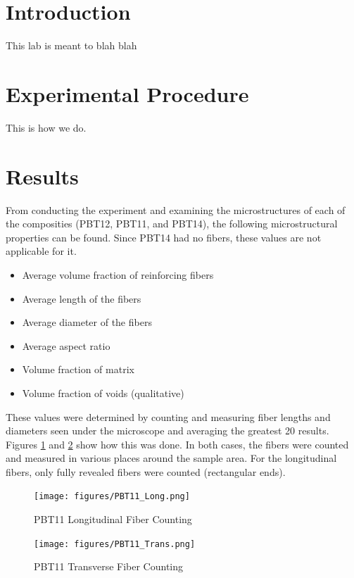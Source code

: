 \documentclass[11pt]{article}
\begin{document}
\tableofcontents
\newpage
\listoffigures
\newpage
\listoftables
\newpage

\section{Introduction}
This lab is meant to blah blah

\section{Experimental Procedure}
This is how we do.

\section{Results}
From conducting the experiment and examining the microstructures of each of the composities (PBT12, PBT11, and PBT14), the following microstructural properties can be found. Since PBT14 had no fibers, these values are not applicable for it.

\begin{itemize}
\item Average volume fraction of reinforcing fibers
\item Average length of the fibers
\item Average diameter of the fibers
\item Average aspect ratio
\item Volume fraction of matrix
\item Volume fraction of voids (qualitative)
\end{itemize}

These values were determined by counting and measuring fiber lengths and diameters seen under the microscope and averaging the greatest 20 results. Figures \ref{pbt11longcount} and \ref{pbt11transcount} show how this was done. In both cases, the fibers were counted and measured in various places around the sample area. For the longitudinal fibers, only fully revealed fibers were counted (rectangular ends).


\begin{figure}[H]
\centering
\texttt{[image: figures/PBT11\_Long.png]}
\caption{PBT11 Longitudinal Fiber Counting}
\label{pbt11longcount}
\end{figure}
\begin{figure}[H]
\centering
\texttt{[image: figures/PBT11\_Trans.png]}
\caption{PBT11 Transverse Fiber Counting}
\label{pbt11transcount}
\end{figure}
\end{document}
